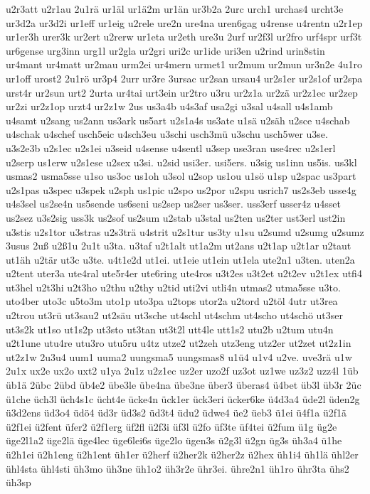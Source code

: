 {u2r3att
u2r1au
2u1rä
ur1äl
ur1ä2m
ur1än
ur3b2a
2urc
urch1
urchas4
urcht3e
ur3d2a
ur3d2i
ur1eff
ur1eig
u2rele
ure2n
ure4na
uren6gag
u4rense
u4rentn
u2r1ep
ur1er3h
urer3k
ur2ert
u2rerw
ur1eta
ur2eth
ure3u
2urf
ur2f3l
ur2fro
urf4spr
urf3t
ur6gense
urg3inn
urg1l
ur2gla
ur2gri
uri2c
ur1ide
uri3en
u2rind
urin8stin
ur4mant
ur4matt
ur2mau
urm2ei
ur4mern
urmet1
ur2mum
ur2mun
ur3n2e
4u1ro
ur1off
urost2
2u1rö
ur3p4
2urr
ur3re
3ursac
ur2san
ursau4
ur2s1er
ur2s1of
ur2spa
urst4r
ur2sun
urt2
2urta
ur4tai
urt3ein
ur2tro
u3ru
ur2z1a
ur2zä
ur2z1ec
ur2zep
ur2zi
ur2z1op
urzt4
ur2z1w
2us
us3a4b
u4s3af
usa2gi
u3sal
u4sall
u4s1amb
u4samt
u2sang
us2ann
us3ark
us5art
u2s1a4s
us3ate
u1sä
u2säh
u2sce
u4schab
u4schak
u4schef
usch5eic
u4sch3eu
u3schi
usch3mü
u3schu
usch5wer
u3se.
u3s2e3b
u2s1ec
u2s1ei
u3seid
u4sense
u4sentl
u3sep
use3ran
use4rec
u2s1erl
u2serp
us1erw
u2s1ese
u2sex
u3si.
u2sid
usi3er.
usi5ers.
u3sig
us1inn
us5is.
us3kl
usmas2
usma5sse
u1so
us3oc
us1oh
u3sol
u2sop
us1ou
u1sö
u1sp
u2spac
us3part
u2s1pas
u3spec
u3spek
u2sph
us1pic
u2spo
us2por
u2spu
usrich7
us2s3eb
usse4g
u4s3sel
us2se4n
us5sende
us6seni
us2sep
us2ser
us3ser.
uss3erf
usser4z
u4sset
us2sez
u3s2sig
uss3k
us2sof
us2sum
u2stab
u3stal
us2ten
us2ter
ust3erl
ust2in
u3stis
u2s1tor
u3stras
u2s3trä
u4strit
u2s1tur
us3ty
u1su
u2sumd
u2sumg
u2sumz
3usus
2uß
u2ß1u
2u1t
u3ta.
u3taf
u2t1alt
ut1a2m
ut2ans
u2t1ap
u2t1ar
u2taut
ut1äh
u2tär
ut3c
u3te.
u4t1e2d
ut1ei.
ut1eie
ut1ein
ut1ela
ute2n1
u3ten.
uten2a
u2tent
uter3a
ute4ral
ute5r4er
ute6ring
ute4ros
u3t2es
u3t2et
u2t2ev
u2t1ex
utfi4
ut3hel
u2t3hi
u2t3ho
u2thu
u2thy
u2tid
uti2vi
utli4n
utmas2
utma5sse
u3to.
uto4ber
uto3c
u5to3m
uto1p
uto3pa
u2tops
utor2a
u2tord
u2töl
4utr
ut3rea
u2trou
ut3rü
ut3sau2
ut2säu
ut3sche
ut4schl
ut4schm
ut4scho
ut4schö
ut3ser
ut3s2k
ut1so
ut1s2p
ut3sto
ut3tan
ut3t2l
utt4le
utt1s2
utu2b
u2tum
utu4n
u2t1une
utu4re
utu3ro
utu5ru
u4tz
utze2
ut2zeh
utz3eng
utz2er
ut2zet
ut2z1in
ut2z1w
2u3u4
uum1
uuma2
uungsma5
uungsmas8
u1ü4
u1v4
u2ve.
uve3rä
u1w
2u1x
ux2e
ux2o
uxt2
u1ya
2u1z
u2z1ec
uz2er
uzo2f
uz3ot
uz1we
uz3z2
uzz4l
1üb
üb1ä
2übc
2übd
üb4e2
übe3le
übe4na
übe3ne
über3
überas4
ü4bet
üb3l
üb3r
2üc
ü1che
üch3l
üch4s1c
ücht4e
ücke4n
ück1er
ück3eri
ücker6ke
ü4d3a4
üde2l
üden2g
ü3d2ens
üd3o4
üdö4
üd3r
üd3s2
üd3t4
üdu2
üdwe4
üe2
üeb3
ü1ei
ü4f1a
ü2f1ä
ü2f1ei
ü2fent
üfer2
ü2f1erg
üf2fl
ü2f3i
üf3l
ü2fo
üf3te
üf4tei
ü2fum
ü1g
üg2e
üge2l1a2
üge2lä
üge4lec
üge6lei6s
üge2lo
ügen3s
ü2g3l
ü2gn
üg3s
üh3a4
ü1he
ü2h1ei
ü2h1eng
ü2h1ent
üh1er
ü2herf
ü2her2k
ü2her2z
ü2hex
üh1i4
üh1lä
ühl2er
ühl4sta
ühl4sti
üh3mo
üh3ne
üh1o2
üh3r2e
ühr3ei.
ühre2n1
üh1ro
ühr3ta
ühs2
üh3sp
}
